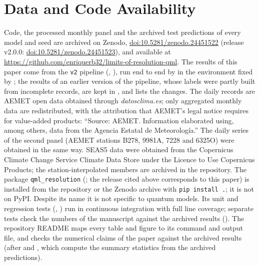 \documentclass[11pt,a4paper]{article}
\begin{document}
\section*{Data and Code Availability}
\label{sec:data_availability}
Code, the processed monthly panel and the archived test predictions of every model and seed are archived on Zenodo, \href{https://doi.org/10.5281/zenodo.24451522}{doi:10.5281/zenodo.24451522} (release v2.0.0: \href{https://doi.org/10.5281/zenodo.24451523}{doi:10.5281/zenodo.24451523}), and available at \url{https://github.com/enriquerb32/limits-of-resolution-qml}. The results of this paper come from the \texttt{v2} pipeline (, ), run end to end by  in the environment fixed by ; the results of an earlier version of the pipeline, whose labels were partly built from incomplete records, are kept in , and  lists the changes. The daily records are AEMET open data obtained through \textit{datosclima.es}; only aggregated monthly data are redistributed, with the attribution that AEMET's legal notice requires for value-added products: ``Source: AEMET. Information elaborated using, among others, data from the Agencia Estatal de Meteorolog\'ia.'' The daily series of the second panel (AEMET stations B278, 9981A, 7228 and 6325O) were obtained in the same way. SEAS5 data were obtained from the Copernicus Climate Change Service Climate Data Store \citep{c3s_seasonal_monthly} under the Licence to Use Copernicus Products; the station-interpolated members are archived in the repository. The package \texttt{qml\_resolution} (; the release cited above corresponds to this paper) is installed from the repository or the Zenodo archive with \texttt{pip install .}; it is not on PyPI. Despite its name it is not specific to quantum models. Its unit and regression tests (, ) run in continuous integration with full line coverage; separate tests check the numbers of the manuscript against the archived results (). The repository README maps every table and figure to its command and output file, and  checks the numerical claims of the paper against the archived results (after  and , which compute the summary statistics from the archived predictions).
\end{document}

